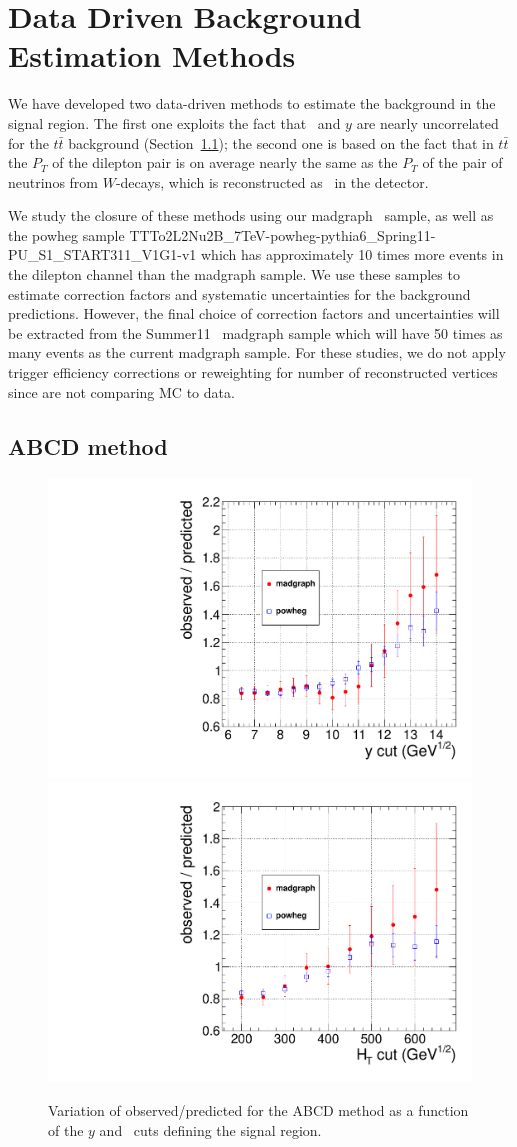 \section{Data Driven Background Estimation Methods}
\label{sec:datadriven}
We have developed two data-driven methods to 
estimate the background in the signal region.
The first one exploits the fact that 
\Ht\ and $y$ are nearly 
uncorrelated for the $t\bar{t}$ background 
(Section~\ref{sec:abcd});  the second one 
is based on the fact that in $t\bar{t}$ the
$P_T$ of the dilepton pair is on average 
nearly the same as the $P_T$ of the pair of neutrinos
from $W$-decays, which is reconstructed as \met\ in the
detector.

We study the closure of these methods using our madgraph \ttbar\ sample, as well as 
the powheg sample TTTo2L2Nu2B\_7TeV-powheg-pythia6\_Spring11-PU\_S1\_START311\_V1G1-v1
which has approximately 10 times more events in the dilepton channel than the madgraph sample.
We use these samples to estimate correction factors and systematic uncertainties for the background predictions. 
However, the final choice of correction factors and uncertainties will be extracted from the Summer11 \ttbar\ madgraph
sample which will have 50 times as many events as the current madgraph sample. 
For these studies, we do not apply trigger efficiency corrections or reweighting for
number of reconstructed vertices since are not comparing MC to data. 

\subsection{ABCD method}
\label{sec:abcd}


\begin{figure}[hbt]
\begin{center}
\includegraphics[width=0.48\linewidth]{plots/abcd_y.pdf}
\includegraphics[width=0.48\linewidth]{plots/abcd_ht.pdf}
\caption{\label{fig:victory}\protect Variation of observed/predicted
for the ABCD method as a function of the $y$ and \Ht\ cuts defining
the signal region.}
\end{center}
\end{figure}


